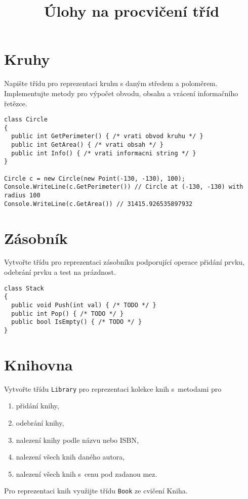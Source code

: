 \documentclass[12pt,a4paper]{article}
\begin{document}
\pagestyle{empty}
\title{Úlohy na procvičení tříd}
\date{\vspace{-12ex}}
\setlength{\droptitle}{-6em}
\setlength{\parindent}{0cm}
\maketitle

\section{Kruhy}

Napište třídu pro reprezentaci kruhu s daným středem a poloměrem. Implementujte
metody pro výpočet obvodu, obsahu a vrácení informačního řetězce.

\begin{verbatim}
class Circle
{
  public int GetPerimeter() { /* vrati obvod kruhu */ }
  public int GetArea() { /* vrati obsah */ }
  public int Info() { /* vrati informacni string */ }
}

Circle c = new Circle(new Point(-130, -130), 100);
Console.WriteLine(c.GetPerimeter()) // Circle at (-130, -130) with radius 100
Console.WriteLine(c.GetArea()) // 31415.926535897932
\end{verbatim}

\section{Zásobník}

Vytvořte třídu pro reprezentaci zásobníku podporující operace přidání prvku,
odebrání prvku a test na prázdnost.

\begin{verbatim}
class Stack
{
  public void Push(int val) { /* TODO */ }
  public int Pop() { /* TODO */ }
  public bool IsEmpty() { /* TODO */ }
}
\end{verbatim}

\section{Knihovna}

Vytvořte třídu \texttt{Library} pro reprezentaci kolekce knih s metodami pro
\begin{enumerate}
	\setlength\itemsep{0em}
	\setlength{\parskip}{0pt}
	\item přidání knihy,
	\item odebrání knihy,
	\item nalezení knihy podle názvu nebo ISBN,
	\item nalezení všech knih daného autora,
	\item nalezení všech knih s cenu pod zadanou mez.
\end{enumerate}

Pro reprezentaci knih využijte třídu \texttt{Book} ze cvičení Kniha.
\end{document}

